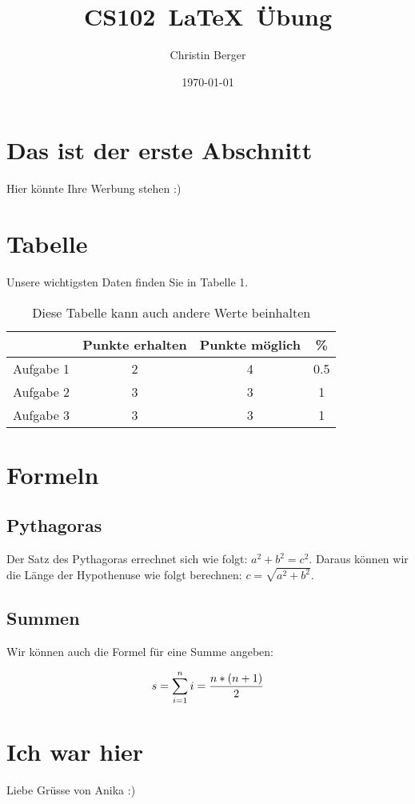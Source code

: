\documentclass{article}
\author{Christin Berger}
\title{CS102\ \LaTeX\ Übung}
\date{\today}
\begin{document}
\maketitle
\section{Das ist der erste Abschnitt}
Hier könnte Ihre Werbung stehen :)
\section{Tabelle}
Unsere wichtigsten Daten finden Sie in Tabelle 1.
\begin{table}[h]
\begin{tabular}{c|c|c|c}
\quad & Punkte erhalten & Punkte möglich & \% \\
\hline
Aufgabe 1 & 2 & 4 & 0.5\\
Aufgabe 2 & 3 & 3 & 1\\
Aufgabe 3 & 3 & 3 & 1\\
\end{tabular}
\caption{Diese Tabelle kann auch andere Werte beinhalten}
\end{table}
\label{Tab 1}
\section{Formeln}
\subsection{Pythagoras}
Der Satz des Pythagoras errechnet sich wie folgt: $a^{2}+b^{2}=c^{2}.$ Daraus können wir die Länge der Hypothenuse wie folgt berechnen: $c=\sqrt{a^{2}+b^{2}}.$
\subsection{Summen}
\begin{flushleft}
Wir können auch die Formel für eine Summe angeben:\\
\end{flushleft}
\begin{equation}
\centering
s=\sum_{i=1}^n{i}=\frac{n*(n+1)}{2}
\end{equation}
\section{Ich war hier}
Liebe Grüsse von Anika :)
\end{document}
